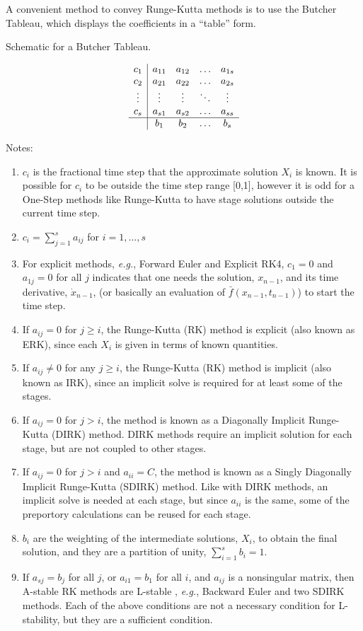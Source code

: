 A convenient method to convey Runge-Kutta methods is to use the Butcher
Tableau, which displays the coefficients in a ``table'' form.
\begin{table}[H]
\caption{Schematic for a Butcher Tableau.\label{rythmos:tab:SchematicButcherTableau}}
\[
\begin{array}{c|cccc}
c_{1} & a_{11} & a_{12} & \ldots & a_{1s}\\
c_{2} & a_{21} & a_{22} & \ldots & a_{2s}\\
\vdots & \vdots & \vdots & \ddots & \vdots\\
c_{s} & a_{s1} & a_{s2} & \ldots & a_{ss}\\
\hline  & b_{1} & b_{2} & \ldots & b_{s}
\end{array}
\]
\end{table}
Notes:
\begin{enumerate}
\item $c_{i}$ is the fractional time step that the approximate solution
$X_{i}$ is known. It is possible for $c_{i}$ to be outside the time
step range {[}0,1{]}, however it is odd for a One-Step methods like
Runge-Kutta to have stage solutions outside the current time step. 
\item $c_{i}=\sum_{j=1}^{s}a_{ij}$ for $i=1,\ldots,s$
\item For explicit methods, \emph{e.g.}, Forward Euler and Explicit RK4,
$c_{1}=0$ and $a_{1j}=0$ for all $j$ indicates that one needs the
solution, $x_{n-1}$, and its time derivative, $\dot{x}_{n-1}$, (or
basically an evaluation of $\bar{f}(x_{n-1},t_{n-1})$) to start the
time step.
\item If $a_{ij}=0$ for $j\ge i$, the Runge-Kutta (RK) method is explicit
(also known as ERK), since each $X_{i}$ is given in terms of known
quantities.
\item If $a_{ij}\ne0$ for any $j\ge i$, the Runge-Kutta (RK) method is
implicit (also known as IRK), since an implicit solve is required
for at least some of the stages.
\item If $a_{ij}=0$ for $j>i$, the method is known as a Diagonally Implicit
Runge-Kutta (DIRK) method. DIRK methods require an implicit solution
for each stage, but are not coupled to other stages.
\item If $a_{ij}=0$ for $j>i$ and $a_{ii}=C$, the method is known as
a Singly Diagonally Implicit Runge-Kutta (SDIRK) method. Like with
DIRK methods, an implicit solve is needed at each stage, but since
$a_{ii}$ is the same, some of the preportory calculations can be
reused for each stage.
\item $b_{i}$ are the weighting of the intermediate solutions, $X_{i}$,
to obtain the final solution, and they are a partition of unity, $\sum_{i=1}^{s}b_{i}=1$.
\item If $a_{sj}=b_{j}$ for all $j$, or $a_{i1}=b_{1}$ for all $i$,
and $a_{ij}$ is a nonsingular matrix, then A-stable RK methods are
L-stable \cite[p. 45]{HairerWanner}\cite[p. 103]{AscherPetzold},
\emph{e.g.}, Backward Euler and two SDIRK methods. Each of the above
conditions are not a necessary condition for L-stability, but they
are a sufficient condition.
\end{enumerate}

